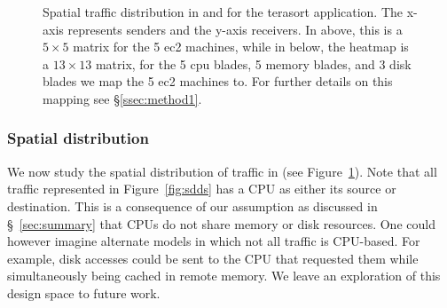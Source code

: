 %
\begin{figure}[t]
  \centering
  \caption{\small{Spatial traffic distribution in \pdis and \dis for the terasort application. The x-axis represents senders and the y-axis receivers. In \pdis above, this is a $5 \times 5$ matrix for the 5 ec2 machines, while in \dis below, the heatmap is a $13 \times 13$ matrix, for the 5 cpu blades, 5 memory blades, and 3 disk blades we map the 5 ec2 machines to. For further details on this mapping see \S\ref{ssec:method1}.}}
  
  \label{fig:sd}
\end{figure}
%
\subsubsection{Spatial distribution}
\label{sssec:spatialdist}
We now study the spatial distribution of traffic in \dis (see Figure~\ref{fig:sd}). Note that all traffic represented in Figure~\ref{fig:sdds} has a CPU as either its source or destination. This is a consequence of our assumption as discussed in \S~\ref{sec:summary} that CPUs do not share memory or disk resources. One could however imagine alternate models in which not all traffic is CPU-based. For example, disk accesses could be sent to the CPU that requested them while simultaneously being cached in remote memory. We leave an exploration of this design space to future work.

